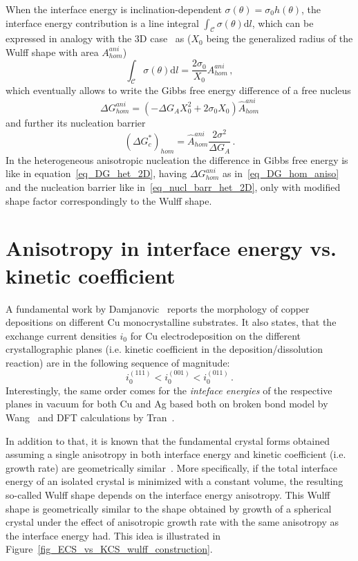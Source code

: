     When the interface energy is inclination-dependent $\sigma(\theta)=\sigma_0 h(\theta)$, the interface energy contribution is a line integral $\int_\mathcal{C} \sigma(\theta) \mathrm{d}l$, which can be expressed in analogy with the 3D case~\cite{Mariaux2011} as ($X_0$ being the generalized radius of the Wulff shape with area $A_{hom}^{ani}$)
    \begin{equation}
        \int_\mathcal{C} \sigma(\theta) \mathrm{d}l = \frac{2\sigma_0}{X_0}A_{hom}^{ani} \,,    
    \end{equation}
    which eventually allows to write the Gibbs free energy difference of a free nucleus
    \begin{equation}\label{eq_DG_hom_aniso}
        \Delta G_{hom}^{ani} = (-\Delta G_A X_0^2 + 2\sigma_0 X_0)\hat{A}_{hom}^{ani} 
    \end{equation}
    and further its nucleation barrier
    \begin{equation} 
        (\Delta G_c^*)_{hom} = \hat{A}_{hom}^{ani}\frac{2\sigma^2}{\Delta G_A}\,.
    \end{equation}
    In the heterogeneous anisotropic nucleation the difference in Gibbs free energy is like in equation~\eqref{eq_DG_het_2D}, having $\Delta G_{hom}^{ani}$ as in~\eqref{eq_DG_hom_aniso} and the nucleation barrier like in~\eqref{eq_nucl_barr_het_2D}, only with modified shape factor correspondingly to the Wulff shape.
    
\section{Anisotropy in interface energy vs. kinetic coefficient}
A fundamental work by Damjanovic~\cite{Damjanovic1966} reports the morphology of copper depositions on different Cu monocrystalline substrates. It also states, that the exchange current densities $i_0$ for Cu electrodeposition on the different crystallographic planes (i.e. kinetic coefficient in the deposition/dissolution reaction) are in the following sequence of magnitude:
\begin{equation}
	i_0^{(111)}<i_0^{(001)}<i_0^{(011)} \,.
\end{equation}
Interestingly, the same order comes for the \textit{inteface energies} of the respective planes in vacuum for both Cu and Ag based both on broken bond model by Wang~\cite{Wang2000} and DFT calculations by Tran~\cite{Tran2016}. 

In addition to that, it is known that the fundamental crystal forms obtained assuming a single anisotropy in both interface energy and kinetic coefficient (i.e. growth rate) are geometrically similar~\cite{Kobayashi2001,Salvalaglio2015}. More specifically, if the total interface energy of an isolated crystal is minimized with a constant volume, the resulting so-called Wulff shape depends on the interface energy anisotropy. This Wulff shape is geometrically similar to the shape obtained by growth of a spherical crystal under the effect of anisotropic growth rate with the same anisotropy as the interface energy had. This idea is illustrated in Figure~\ref{fig_ECS_vs_KCS_wulff_construction}.

